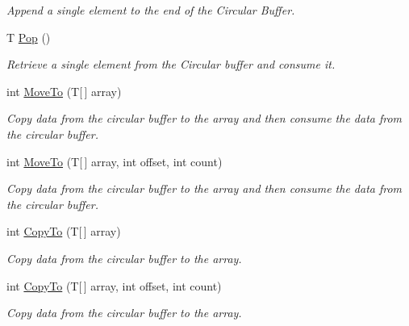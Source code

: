 \begin{DoxyCompactItemize}
\begin{DoxyCompactList}\small\item\em Append a single element to the end of the Circular Buffer. \end{DoxyCompactList}\item 
T \mbox{\hyperlink{class_r_j_c_p_1_1_datastructures_1_1_circular_buffer_a23fe5c95e248c9b3d7a45283e1d76e30}{Pop}} ()
\begin{DoxyCompactList}\small\item\em Retrieve a single element from the Circular buffer and consume it. \end{DoxyCompactList}\item 
int \mbox{\hyperlink{class_r_j_c_p_1_1_datastructures_1_1_circular_buffer_ad7524ae69bbcbca58bfba02c65ea9cf8}{Move\+To}} (T\mbox{[}$\,$\mbox{]} array)
\begin{DoxyCompactList}\small\item\em Copy data from the circular buffer to the array and then consume the data from the circular buffer. \end{DoxyCompactList}\item 
int \mbox{\hyperlink{class_r_j_c_p_1_1_datastructures_1_1_circular_buffer_a2c5705e46e1d21a18b6213caad9d00b0}{Move\+To}} (T\mbox{[}$\,$\mbox{]} array, int offset, int count)
\begin{DoxyCompactList}\small\item\em Copy data from the circular buffer to the array and then consume the data from the circular buffer. \end{DoxyCompactList}\item 
int \mbox{\hyperlink{class_r_j_c_p_1_1_datastructures_1_1_circular_buffer_a71e329c44fe7e70277066977fa930c08}{Copy\+To}} (T\mbox{[}$\,$\mbox{]} array)
\begin{DoxyCompactList}\small\item\em Copy data from the circular buffer to the array. \end{DoxyCompactList}\item 
int \mbox{\hyperlink{class_r_j_c_p_1_1_datastructures_1_1_circular_buffer_acad3a14b8d66b7aa307565fab22cb851}{Copy\+To}} (T\mbox{[}$\,$\mbox{]} array, int offset, int count)
\begin{DoxyCompactList}\small\item\em Copy data from the circular buffer to the array. \end{DoxyCompactList}\end{DoxyCompactItemize}

